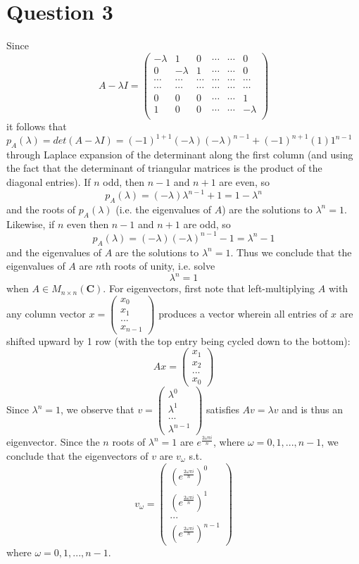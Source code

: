 \documentclass[12pt]{article}
\renewcommand{\=}[1]{\stackrel{#1}{=}} %
\theoremstyle{definition}
\begin{document}
\pagestyle{empty}
\section*{Question 3}\LARGE
Since $$A - \lambda I = \left(\begin{array}{cccccc}
-\lambda&1&0&\cdots&\cdots&0\\
0&-\lambda&1&\cdots&\cdots&0\\
\cdots&\cdots&\cdots&\cdots&\cdots&\cdots\\
\cdots&\cdots&\cdots&\cdots&\cdots&\cdots\\
0&0&0&\cdots&\cdots&1\\
1&0&0&\cdots&\cdots&-\lambda\\
\end{array}\right)$$it follows that $p_A(\lambda) = det(A-\lambda I) = (-1)^{1+1}(-\lambda)(-\lambda)^{n-1} + (-1)^{n+1}(1)1^{n-1}$ through Laplace expansion of the determinant along the first column (and using the fact that the determinant of triangular matrices is the product of the diagonal entries). If $n$ odd, then $n-1$ and $n+1$ are even, so$$p_A(\lambda) = (-\lambda)\lambda^{n-1} + 1 = 1 - \lambda^n$$ and the roots of $p_A(\lambda)$ (i.e. the eigenvalues of $A$) are the solutions to $\lambda^n = 1$. Likewise, if $n$ even then $n-1$ and $n+1$ are odd, so $$p_A(\lambda) = (-\lambda)(-\lambda)^{n-1} - 1 = \lambda^n - 1$$ and the eigenvalues of $A$ are the solutions to $\lambda^n = 1$. Thus we conclude that the eigenvalues of $A$ are $n$th roots of unity, i.e. solve $$\lambda^n = 1$$ when $A \in M_{n\times n}(\textbf{C})$.
\newpage
\noindent For eigenvectors, first note that left-multiplying $A$ with any column vector $x = \begin{pmatrix}
    x_0 \\ x_1\\ ...\\ x_{n-1}
\end{pmatrix}$ produces a vector wherein all entries of $x$ are shifted upward by 1 row (with the top entry being cycled down to the bottom):
$$Ax = \begin{pmatrix}
    x_{1} \\ x_2\\ ...\\ x_{0}
\end{pmatrix}$$Since $\lambda^n = 1$, we observe that $v = \begin{pmatrix}
    \lambda^0 \\ \lambda^1\\ ...\\ \lambda^{n-1}
\end{pmatrix}$ satisfies $Av = \lambda v$ and is thus an eigenvector. Since the $n$ roots of $\lambda^n = 1$ are $e^{\frac{2\omega\pi i}{n}}$, where $\omega = 0, 1, ..., n-1$, we conclude that the eigenvectors of $v$ are $v_{\omega}$ s.t.$$v_{\omega} = \begin{pmatrix}
    (e^{\frac{2\omega\pi i}{n}})^0 \\ (e^{\frac{2\omega\pi i}{n}})^1\\ ...\\(e^{\frac{2\omega\pi i}{n}})^{n-1}
\end{pmatrix}$$ where $\omega = 0, 1, ..., n-1$.
\end{document}
